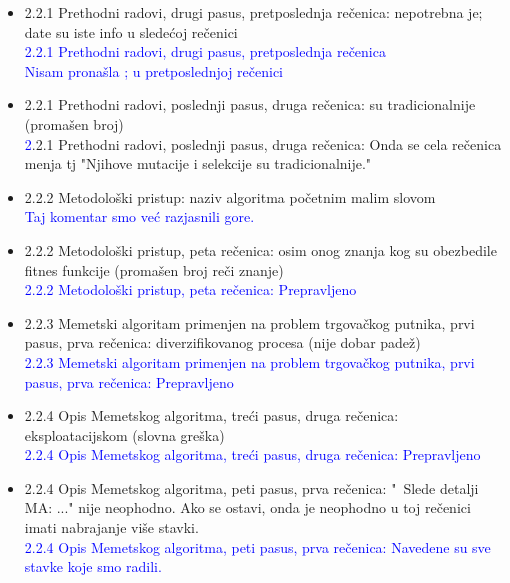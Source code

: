 \documentclass[a4paper]{report}
\newcommand{\odgovor}[1]{\textcolor{blue}{#1}}
\begin{document}
\begin{itemize}
    \item 2.2.1 Prethodni radovi, drugi pasus, pretposlednja rečenica: nepotrebna je; date su iste info u sledećoj rečenici\\
    \odgovor{ 2.2.1 Prethodni radovi, drugi pasus, pretposlednja rečenica \\ Nisam pronašla ; u pretposlednjoj rečenici \\}
    
    \item 2.2.1 Prethodni radovi, poslednji pasus, druga rečenica: su tradicionalnije (promašen broj)\\
      \odgovor2.2.1 Prethodni radovi, poslednji pasus, druga rečenica:
      Onda se cela rečenica menja tj "Njihove mutacije i selekcije su tradicionalnije."
    
    
    \item 2.2.2 Metodološki pristup: naziv algoritma početnim malim slovom\\
    \odgovor{ Taj komentar smo već razjasnili gore.}
    
    \item 2.2.2 Metodološki pristup, peta rečenica: osim onog znanja kog su obezbedile fitnes funkcije (promašen broj reči znanje)\\
    \odgovor{ 2.2.2 Metodološki pristup, peta rečenica: Prepravljeno \\} 
    
    
    \item 2.2.3 Memetski algoritam primenjen na problem trgovačkog putnika, prvi pasus, prva rečenica: diverzifikovanog procesa (nije dobar padež)\\ 
     \odgovor{ 2.2.3 Memetski algoritam primenjen na problem trgovačkog putnika, prvi pasus, prva rečenica: Prepravljeno \\}
    
    \item 2.2.4 Opis Memetskog algoritma, treći pasus, druga rečenica: eksploatacijskom (slovna greška)\\ 
    \odgovor{  2.2.4 Opis Memetskog algoritma, treći pasus, druga rečenica:  Prepravljeno \\}
    
    \item 2.2.4 Opis Memetskog algoritma, peti pasus, prva rečenica: "\ Slede detalji MA: ..." \hspace{0.075cm} nije neophodno. Ako se ostavi, onda je neophodno u toj rečenici imati nabrajanje više stavki. \\ 
    \odgovor{ 2.2.4 Opis Memetskog algoritma, peti pasus, prva rečenica: Navedene su sve stavke koje smo radili. \\}
   

\end{itemize}
\end{document}
